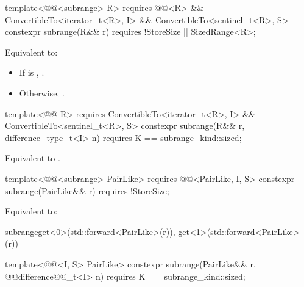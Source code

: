 {\color{newclr}
%
\begin{itemdecl}
template<@@<subrange> R>
  requires @@<R> &&
    ConvertibleTo<iterator_t<R>, I> && ConvertibleTo<sentinel_t<R>, S>
constexpr subrange(R&& r) requires !StoreSize || SizedRange<R>;
\end{itemdecl}

\begin{itemdescr}
\pnum
\effects Equivalent to:
\begin{itemize}
\item If  is ,
.
\item Otherwise, .
\end{itemize}
\end{itemdescr}

%
\begin{itemdecl}
template<@@ R>
  requires ConvertibleTo<iterator_t<R>, I> && ConvertibleTo<sentinel_t<R>, S>
constexpr subrange(R&& r, difference_type_t<I> n)
  requires K == subrange_kind::sized;
\end{itemdecl}

\begin{itemdescr}
\pnum
\effects Equivalent to .
\end{itemdescr}
} %

%
\begin{itemdecl}
template<@@<subrange> PairLike>
  requires @@<PairLike, I, S>
constexpr subrange(PairLike&& r) requires !StoreSize;
\end{itemdecl}

\begin{itemdescr}
\pnum
\effects Equivalent to:
\begin{codeblock}
subrange{get<0>(std::forward<PairLike>(r)), get<1>(std::forward<PairLike>(r))}
\end{codeblock}
\end{itemdescr}

%
\begin{itemdecl}
template<@@<I, S> PairLike>
constexpr subrange(PairLike&& r, @@difference@@_t<I> n)
  requires K == subrange_kind::sized;
\end{itemdecl}

